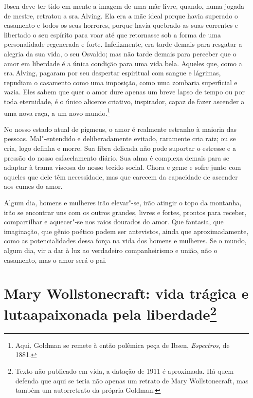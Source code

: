 Ibsen deve ter tido em mente a imagem de uma mãe livre, quando, numa
jogada de mestre, retratou a sra.\,Alving. Ela era a mãe ideal porque
havia superado o casamento e todos os seus horrores, porque havia
quebrado as suas correntes e libertado o seu espírito para voar até que
retornasse sob a forma de uma personalidade regenerada e forte.
Infelizmente, era tarde demais para resgatar a alegria da sua vida, o
seu Osvaldo; mas não tarde demais para perceber que o amor em liberdade
é a única condição para uma vida bela. Aqueles que, como a sra.\,Alving,
pagaram por seu despertar espiritual com sangue e lágrimas, repudiam o
casamento como uma imposição, como uma zombaria superficial e vazia.
Eles sabem que quer o amor dure apenas um breve lapso de tempo ou por
toda eternidade, é o único alicerce criativo, inspirador, capaz de fazer
ascender a uma nova raça, a um novo mundo.\footnote{Aqui, Goldman se remete à então polêmica peça de Ibsen, \textit{Espectros}, de 1881.}

No nosso estado atual de pigmeus, o amor é realmente estranho à maioria
das pessoas. Mal"-entendido e deliberadamente evitado, raramente cria
raiz; ou se cria, logo definha e morre. Sua fibra delicada não pode
suportar o estresse e a pressão do nosso esfacelamento diário. Sua alma é complexa
demais para se adaptar à trama viscosa do nosso tecido social. Chora e
geme e sofre junto com aqueles que dele têm necessidade, mas que carecem
da capacidade de ascender aos cumes do amor.

Algum dia, homens e mulheres irão elevar"-se, irão atingir o topo da
montanha, irão se encontrar uns com os outros grandes, livres e fortes,
prontos para receber, compartilhar e aquecer"-se nos raios dourados do
amor. Que fantasia, que imaginação, que gênio poético podem ser antevistos, ainda que aproximadamente, como as potencialidades dessa força na vida
dos homens e mulheres. Se o mundo, algum dia, vir a dar à luz ao verdadeiro
companheirismo e união, não o casamento, mas o amor será o pai.

\chapter[Mary Wollstonecraft: vida trágica e luta apaixonada pela liberdade]{Mary Wollstonecraft: vida trágica e luta\break apaixonada pela
liberdade\footnote{Texto não publicado em vida, a datação de 1911 é
  aproximada. Há quem defenda que aqui se teria não apenas um retrato de
  Mary Wollstonecraft, mas também um autorretrato da própria Goldman.}}


